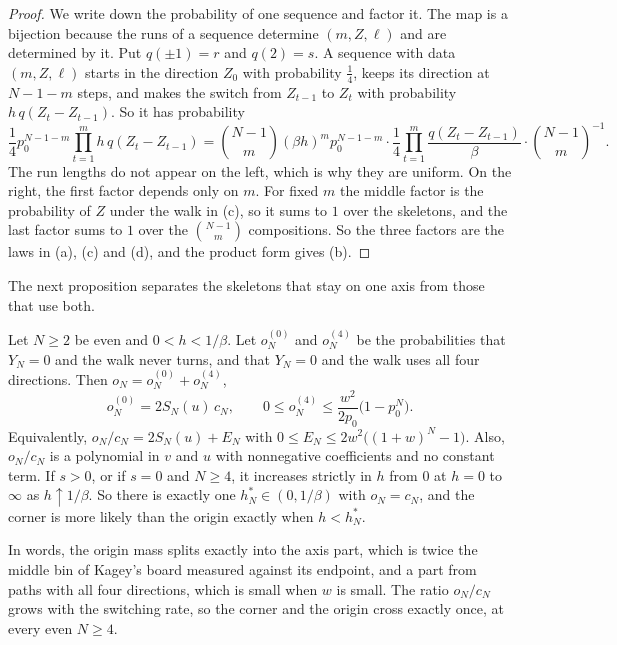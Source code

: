 \begin{proof}
We write down the probability of one sequence and factor it. The map is a bijection because the
runs of a sequence determine $(m,Z,\ell)$ and are determined by it. Put $q(\pm1)=r$ and $q(2)=s$.
A sequence with data $(m,Z,\ell)$ starts in the direction $Z_0$ with probability $\frac14$, keeps
its direction at $N-1-m$ steps, and makes the switch from $Z_{t-1}$ to $Z_t$ with probability
$h\,q(Z_t-Z_{t-1})$. So it has probability
\[
 \frac14p_0^{N-1-m}\prod_{t=1}^mh\,q(Z_t-Z_{t-1})
 =\binom{N-1}m(\beta h)^mp_0^{N-1-m}\cdot\frac14\prod_{t=1}^m\frac{q(Z_t-Z_{t-1})}\beta
 \cdot\binom{N-1}m^{-1}.
\]
The run lengths do not appear on the left, which is why they are uniform. On the right, the first
factor depends only on $m$. For fixed $m$ the middle factor is the probability of $Z$ under the walk
in (c), so it sums to $1$ over the skeletons, and the last factor sums to $1$ over the
$\binom{N-1}m$ compositions. So the three factors are the laws in (a), (c) and (d), and the product
form gives (b).
\end{proof}

The next proposition separates the skeletons that stay on one axis from those
that use both.

\begin{proposition}\label{prop:decomp}
Let $N\ge2$ be even and $0<h<1/\beta$. Let $o^{(0)}_N$ and $o^{(4)}_N$ be the probabilities that
$Y_N=0$ and the walk never turns, and that $Y_N=0$ and the walk uses all four directions. Then
$o_N=o^{(0)}_N+o^{(4)}_N$,
\[
 o^{(0)}_N=2S_N(u)\,c_N,\qquad 0\le o^{(4)}_N\le\frac{w^2}{2p_0}\bigl(1-p_0^N\bigr).
\]
Equivalently, $o_N/c_N=2S_N(u)+E_N$ with $0\le E_N\le2w^2\bigl((1+w)^N-1\bigr)$. Also, $o_N/c_N$
is a polynomial in $v$ and $u$ with nonnegative coefficients and no constant term. If $s>0$, or if
$s=0$ and $N\ge4$, it increases strictly in $h$ from $0$ at $h=0$ to $\infty$ as $h\uparrow1/\beta$.
So there is exactly one $h^*_N\in(0,1/\beta)$ with $o_N=c_N$, and the corner is more likely than the
origin exactly when $h<h^*_N$.
\end{proposition}

In words, the origin mass splits exactly into the axis part, which is twice the
middle bin of Kagey's board measured against its endpoint, and a part from
paths with all four directions, which is small when $w$ is small. The ratio
$o_N/c_N$ grows with the switching rate, so the corner and the origin cross
exactly once, at every even $N\ge4$.

